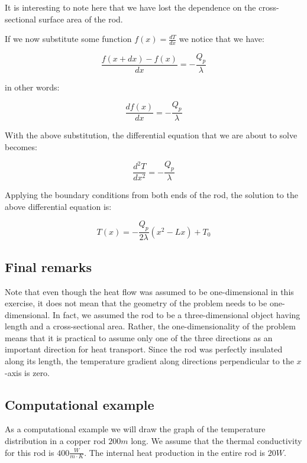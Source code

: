 \documentclass[10pt]{article}
\begin{document}
It is interesting to note here that we have lost the dependence on the cross-sectional surface area of the rod.

If we now substitute some function $f(x) = \frac{dT}{dx}$ we notice that we have:

\begin{equation*}
\frac{f(x + dx) - f(x)}{dx} = - \frac{Q_p}{\lambda}
\end{equation*}

in other words:

\begin{equation}
\frac{df(x)}{dx} = - \frac{Q_p}{\lambda}
\end{equation}

With the above substitution, the differential equation that we are about to solve becomes:

\begin{equation}
\frac{d^2T}{dx^2} = - \frac{Q_p}{\lambda}
\end{equation}

Applying the boundary conditions from both ends of the rod, the solution to the above differential equation is:

\begin{equation}
T(x) = - \frac{Q_p}{2 \lambda} (x^2 - Lx) + T_0
\label{eq:solution}
\end{equation}

\subsection{Final remarks}

Note that even though the heat flow was assumed to be one-dimensional in this exercise, it does not mean that the geometry of the problem needs to be one-dimensional. In fact, we assumed the rod to be a three-dimensional object having length and a cross-sectional area. Rather, the one-dimensionality of the problem means that it is practical to assume only one of the three directions as an important direction for heat transport. Since the rod was perfectly insulated along its length, the temperature gradient along directions perpendicular to the $x$-axis is zero.

\subsection{Computational example}

As a computational example we will draw the graph of the temperature distribution in a copper rod $200 m$ long. We assume that the thermal conductivity for this rod is $400 \frac{W}{m \cdot K}$. The internal heat production in the entire rod is $20 W$.
\end{document}
